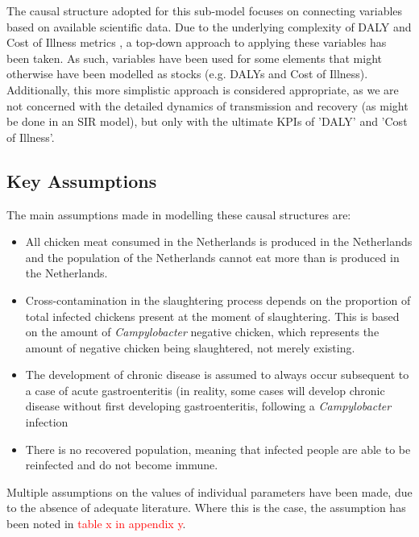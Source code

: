 The causal structure adopted for this sub-model focuses on connecting variables based on available scientific data. Due to the underlying complexity of DALY and Cost of Illness metrics \parencite{jo_cost--illness_2014}, a top-down approach to applying these variables has been taken. As such, variables have been used for some elements that might otherwise have been modelled as stocks (e.g. DALYs and Cost of Illness). Additionally, this more simplistic approach is considered appropriate, as we are not concerned with the detailed dynamics of transmission and recovery (as might be done in an SIR model), but only with the ultimate KPIs of 'DALY' and 'Cost of Illness'. %

\subsection{Key Assumptions}
\label{s:assumptions}
The main assumptions made in modelling these causal structures are:
\begin{itemize}
    \item All chicken meat consumed in the Netherlands is produced in the Netherlands and the population of the Netherlands cannot eat more than is produced in the Netherlands. 
    \item Cross-contamination in the slaughtering process depends on the proportion of total infected chickens present at the moment of slaughtering. This is based on the amount of \textit{Campylobacter} negative chicken, which represents the amount of negative chicken being slaughtered, not merely existing. %
    \item The development of chronic disease is assumed to always occur subsequent to a case of acute gastroenteritis (in reality, some cases will develop chronic disease without first developing gastroenteritis, following a \textit{Campylobacter} infection
    \item There is no recovered population, meaning that infected people are able to be reinfected and do not become immune.
\end{itemize}

Multiple assumptions on the values of individual parameters have been made, due to the absence of adequate literature. Where this is the case, the assumption has been noted in \textcolor{red}{table x in appendix y}. %

